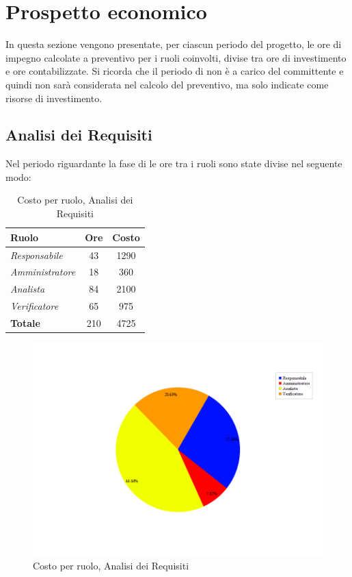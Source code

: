 \section{Prospetto economico}
In questa sezione vengono presentate, per ciascun periodo del progetto, le ore di impegno calcolate a preventivo per i ruoli coinvolti, divise tra ore di investimento e ore contabilizzate. Si ricorda che il periodo di \textit{\AdR} non è a carico del committente e quindi non sarà considerata nel calcolo del preventivo, ma solo indicate come risorse di investimento.
\subsection{Analisi dei Requisiti}
Nel periodo riguardante la fase di \textit{\AdR} le ore tra i ruoli sono state divise nel seguente modo:

\begin{table}[H]
	\begin{center}
		\begin{tabular}{|l|c|c|}
			\hline
			\textbf{Ruolo}	& \textbf{Ore} & \textbf{Costo} \\
			\hline
			\textit{Responsabile	}&	43	&	 1290	\\
			\hline
			\textit{Amministratore}	&	18	&	 360	\\
			\hline
			\textit{Analista}		&	84	&	 2100	\\
			\hline
			\textit{Verificatore}	&	65	&	 975	\\
			\hline
			\textbf{Totale} &	210	&	4725	\\
			\hline
		\end{tabular}
	\end{center}
	\caption{Costo per ruolo, Analisi dei Requisiti}
\end{table}

\begin{figure}[H]
	\centering
	\includegraphics[scale=0.4]{immagini/Grafi/CostoAR}
	\caption{Costo per ruolo, Analisi dei Requisiti}
\end{figure}

